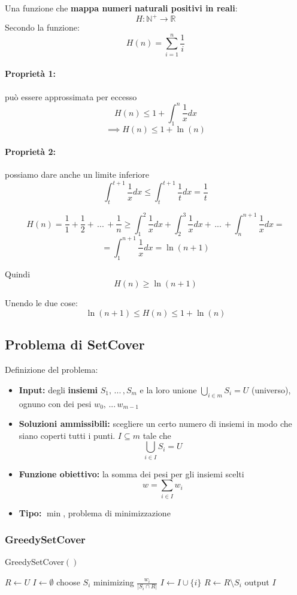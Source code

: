 Una funzione che \textbf{mappa numeri naturali positivi in reali}:
$$ H: \mathbb{N}^+ \rightarrow \mathbb{R} $$
Secondo la funzione:
$$ H(n) = \sum_{i=1}^n \frac{1}{i} $$

\paragraph{Proprietà 1:}  può essere approssimata per eccesso
$$ H(n) \leq 1 + \int_1^n \frac{1}{x} dx$$
$$ \implies H(n) \leq 1 + \ln (n) $$

\paragraph{Proprietà 2:} possiamo dare anche un limite inferiore
$$ \int_t^{t+1} \frac{1}{x} dx \leq \int_t^{t+1} \frac{1}{t} dx = \frac{1}{t} $$

$$ H(n) = \frac{1}{1} + \frac{1}{2} + \, ... \, + \frac{1}{n} \geq \int_{1}^{2} \frac{1}{x} dx + \int_{2}^{3} \frac{1}{x} dx + \, ... \, + \int_{n}^{n+1} \frac{1}{x} dx =$$
$$ = \int_1^{n+1} \frac{1}{x} dx = \ln(n+1)$$

Quindi 
$$ H(n) \geq \ln(n+1) $$

Unendo le due cose:
$$ \ln (n+1) \leq H(n) \leq 1 + \ln(n) $$

\newpage

\subsection{Problema di SetCover}
\label{subsec:setcover}
Definizione del problema:
\begin{itemize}
	\item \textbf{Input:} degli \textbf{insiemi} $S_1, \, ... \, , S_m$ e la loro unione $\bigcup_{i \in m} S_i = U$ (universo), ognuno con dei pesi $w_0, \, ... \, w_{m-1}$
	
	\item \textbf{Soluzioni ammissibili:} scegliere un certo numero di insiemi in modo che siano coperti tutti i punti. $I \subseteq m$ tale che
	$$ \bigcup_{i \in I} S_i = U $$
	
	\item \textbf{Funzione obiettivo:} la somma dei pesi per gli insiemi scelti
	$$ w = \sum_{i \in I} w_i $$
	
	\item \textbf{Tipo:} $\min$, problema di minimizzazione
\end{itemize}

\subsubsection{GreedySetCover}
\begin{algorithm}
	\caption{GreedySetCover$()$}
	\begin{algorithmic}
		\STATE $R \leftarrow U$
		\STATE $I \leftarrow \emptyset$
		\STATE choose $S_i$ minimizing $\frac{w_i}{|S_i \cap R|}$
		\STATE $I \leftarrow I \cup \{i\}$
		\STATE $R \leftarrow R \setminus S_i$
		\ENDWHILE
		\STATE output $I$
	\end{algorithmic}
\end{algorithm}


